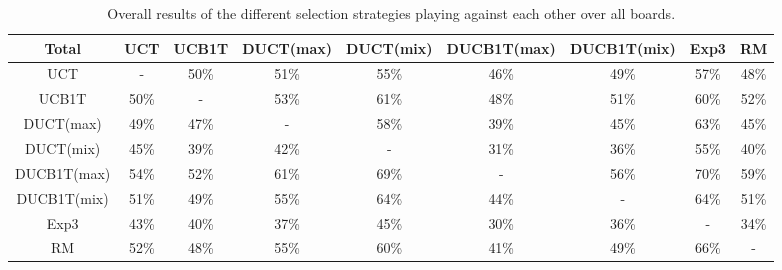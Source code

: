 \documentclass{article}
\begin{document}
\begin{table}[h!]\scriptsize
\centering
\begin{tabular}{|c||c|c|c|c|c|c|c|c|}
									\hline
  Total 	     	& UCT 	& UCB1T		& DUCT(max)	& DUCT(mix)	& DUCB1T(max)	& DUCB1T(mix)	& Exp3	& RM				\\ 	
  \hline
  \hline
   UCT &    - & 50\% & 51\% & 55\% & 46\% & 49\% & 57\% & 48\% \\ \hline 
 UCB1T & 50\% &    - & 53\% & 61\% & 48\% & 51\% & 60\% & 52\% \\ \hline 
   DUCT(max) & 49\% & 47\% &    - & 58\% & 39\% & 45\% & 63\% & 45\% \\ \hline 
   DUCT(mix) & 45\% & 39\% & 42\% &    - & 31\% & 36\% & 55\% & 40\% \\ \hline 
 DUCB1T(max) & 54\% & 52\% & 61\% & 69\% &    - & 56\% & 70\% & 59\% \\ \hline 
 DUCB1T(mix) & 51\% & 49\% & 55\% & 64\% & 44\% &    - & 64\% & 51\% \\ \hline 
      Exp3 & 43\% & 40\% & 37\% & 45\% & 30\% & 36\% &    - & 34\% \\ \hline 
        RM & 52\% & 48\% & 55\% & 60\% & 41\% & 49\% & 66\% &    - \\ \hline 
\end{tabular}
\caption{Overall results of the different selection strategies playing against each other over all boards.}
\label{table:round_robin_total}
\end{table}
\end{document}
